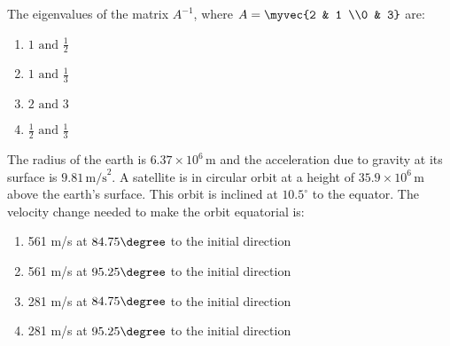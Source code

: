 \item  The eigenvalues of the matrix $A^{-1}$, where 
$ A = \myvec{2 & 1 \\0 & 3}$
are:
\begin{multicols}{4}
\begin{enumerate}
\item $1 \text{ and } \frac{1}{2}$
\item $1 \text{ and } \frac{1}{3}$
\item $2 \text{ and } 3$
\item $\frac{1}{2} \text{ and } \frac{1}{3}$

\end{enumerate}
\end{multicols}

\item  The radius of the earth is $6.37 \times 10^6 \, \text{m}$ and the acceleration due to gravity at its surface is $9.81 \, \text{m/s}^2$. A satellite is in circular orbit at a height of $35.9 \times 10^6 \, \text{m}$ above the earth's surface. This orbit is inclined at $10.5^\circ$ to the equator. The velocity change needed to make the orbit equatorial is:
\begin{enumerate}
\item 561 m/s at $84.75\degree$ to the initial direction
\item 561 m/s at $95.25\degree$ to the initial direction
\item 281 m/s at $84.75\degree$ to the initial direction
\item 281 m/s at $95.25\degree$ to the initial direction
\end{enumerate}

